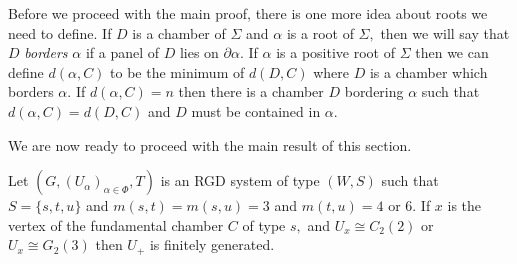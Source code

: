 \documentclass[class=book, crop=false]{standalone}
\begin{document}
Before we proceed with the main proof, there is one more idea about roots we need to define. If $D$ is a chamber of $\Sigma$ and $\alpha$ is a root of $\Sigma,$ then we will say that $D$ \emph{borders} $\alpha$ if a panel of $D$ lies on $\partial\alpha.$  If $\alpha$ is a positive root of $\Sigma$ then we can define $d(\alpha,C)$ to be the minimum of $d(D,C)$ where $D$ is a chamber which borders $\alpha.$ If $d(\alpha,C)=n$ then there is a chamber $D$ bordering $\alpha$ such that $d(\alpha,C)=d(D,C)$ and $D$ must be contained in $\alpha.$ 

We are now ready to proceed with the main result of this section.

\begin{theorem}
	\label{thm:334fg}
	Let $(G,(U_\alpha)_{\alpha\in \Phi},T)$ is an RGD system of type $(W,S)$ such that $S=\{s,t,u\}$ and $m(s,t)=m(s,u)=3$ and $m(t,u)=4$ or $6.$ If $x$ is the vertex of the fundamental chamber $C$ of type $s,$ and $U_x\cong C_2(2)$ or $U_x\cong G_2(3)$ then $U_+$ is finitely generated.
\end{theorem}
\end{document}
